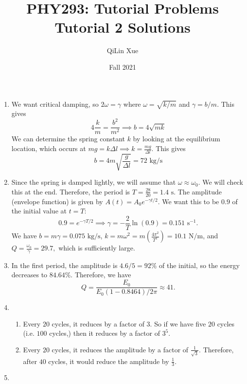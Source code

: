 \documentclass{article}
\title{PHY293: Tutorial Problems \\ \textbf{Tutorial 2 Solutions}}
\author{QiLin Xue}
\date{Fall 2021}
\begin{document}
\maketitle
\begin{enumerate}
    \item We want critical damping, so $2\omega = \gamma$ where $\omega=\sqrt{k/m}$ and $\gamma=b/m$. This gives 
    \begin{equation}
        4\frac{k}{m} =  \frac{b^2}{m^2} \implies b = 4\sqrt{mk}
    \end{equation}
    We can determine the spring constant $k$ by looking at the equilibrium location, which occurs at $mg=k\Delta l \implies k = \frac{mg}{\Delta l}$. This gives 
    \begin{equation}
        b = 4m\sqrt{\frac{g}{\Delta l}} = \boxed{\text{72 kg/s}}
    \end{equation}
    \item Since the spring is damped lightly, we will assume that $\omega \approx \omega_0$. We will check this at the end. Therefore, the period is $T = \frac{28}{20} = 1.4\text{ s}$. The amplitude (envelope function) is given by $A(t) = A_0 e^{-\gamma t/2}.$ We want this to be $0.9$ of the initial value at $t=T$: 
    \begin{equation}
        0.9 = e^{-\gamma T/2} \implies \gamma = -\frac{2}{T}\ln(0.9) = 0.151\text{ s}^{-1}.
    \end{equation} 
    We have $b=m\gamma = 0.075\text{ kg/s}$, $k = m\omega^2 = m\left(\frac{4\pi^2}{T^2}\right) = 10.1 \text{ N/m}$, and $Q=\frac{\omega_0}{\gamma} = 29.7,$ which is sufficiently large.
    \item In the first period, the amplitude is $4.6/5=92\%$ of the initial, so the energy decreases to $84.64\%.$ Therefore, we have 
    \begin{equation}
        Q = \frac{E_0}{E_0(1-0.8464)/2\pi} \approx 41.
    \end{equation}
    \item \begin{enumerate}
        \item Every $20$ cycles, it reduces by a factor of $3$. So if we have five $20$ cycles (i.e. $100$ cycles,) then it reduces by a factor of $3^5.$
        \item Every $20$ cycles, it reduces the amplitude by a factor of $\frac{1}{\sqrt{3}}$. Therefore, after $40$ cycles, it would reduce the amplitude by $\frac{1}{3}$.
    \end{enumerate}
    \item \begin{enumerate}

\end{enumerate}
\end{enumerate}
\end{document}
